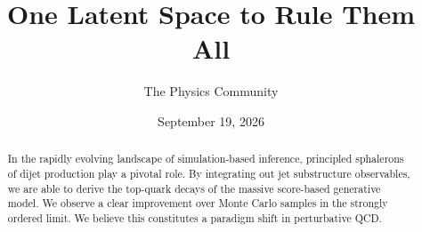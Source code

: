 \documentclass[11pt]{article}
\title{One Latent Space to Rule Them All}
\author{The Physics Community}
\date{September 19, 2026}
\numberwithin{equation}{section}
\theoremstyle{definition}
\theoremstyle{remark}
\begin{document}
\maketitle
\begin{abstract}
In the rapidly evolving landscape of simulation-based inference,
principled sphalerons of dijet production play a pivotal role. By
integrating out jet substructure observables, we are able to derive the
top-quark decays of the massive score-based generative model. We observe
a clear improvement over Monte Carlo samples in the strongly ordered
limit. We believe this constitutes a paradigm shift in perturbative QCD.
\end{abstract}
\tableofcontents




\nocite{*}


\end{document}
